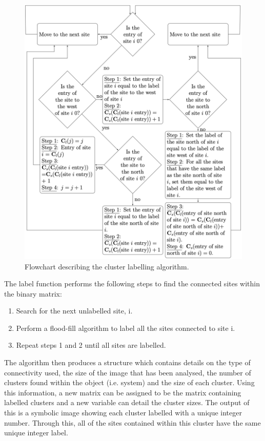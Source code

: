\begin{figure}
    \centering
    \includegraphics[scale=0.55]{appendix/figures/CCA-Flow.pdf}
    \caption{Flowchart describing the cluster labelling algorithm.}
    \label{fig:my_label}
\end{figure}

\newpage

The label function performs the following steps to find the connected sites within the binary matrix:
\begin{enumerate}
    \item Search for the next unlabelled site, i.
    \item Perform a flood-fill algorithm to label all the sites connected to site i.
    \item Repeat steps 1 and 2 until all sites are labelled.
\end{enumerate}

The algorithm then produces a structure which contains details on the type of connectivity used, 
the size of the image that has been analysed, the number of clusters found within the object (i.e. system) and the size of each cluster. 
Using this information, a new matrix can be assigned to be the matrix containing labelled clusters and a new variable can detail the cluster sizes. 
The output of this is a symbolic image showing each cluster labelled with a unique integer number. 
Through this, all of the sites contained within this cluster have the same unique integer label.

